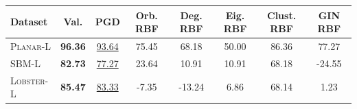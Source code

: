 \begin{tabular}{lccccccc}
\toprule
\textbf{Dataset} & \textbf{Val.} & \textbf{PGD} & \textbf{Orb. RBF} & \textbf{Deg. RBF} & \textbf{Eig. RBF} & \textbf{Clust. RBF} & \textbf{GIN RBF} \\
\midrule
\textsc{Planar-L} & \textbf{96.36} & \underline{93.64} & 75.45 & 68.18 & 50.00 & 86.36 & 77.27 \\
\textsc{SBM-L} & \textbf{82.73} & \underline{77.27} & 23.64 & 10.91 & 10.91 & 68.18 & -24.55 \\
\textsc{Lobster-L} & \textbf{85.47} & \underline{83.33} & -7.35 & -13.24 & 6.86 & 68.14 & 1.23 \\
\bottomrule
\end{tabular}